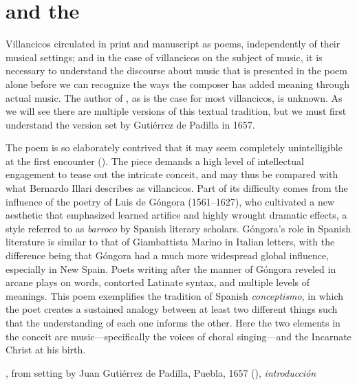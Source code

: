 \section{ and the }

Villancicos circulated in print and manuscript as poems, independently of their
musical settings; and in the case of villancicos on the subject of music, it is
necessary to understand the discourse about music that is presented in the poem
alone before we can recognize the ways the composer has added meaning through
actual music.
The author of , as is the case for most
villancicos, is unknown.
As we will see there are multiple versions of this textual tradition, but we
must first understand the version set by Gutiérrez de Padilla in 1657.

The poem is so elaborately contrived that it may seem completely unintelligible
at the first encounter
().%
    \Autocites
    [37--38, 119--132]{Cashner:WLSCM32}
    [133--203]{Cashner:PhD}
The piece demands a high level of intellectual engagement to tease out the
intricate conceit, and may thus be compared with what Bernardo Illari describes
as  villancicos.%
    \Autocite[vol. 2, 304--308]{Illari:Polychoral}
Part of its difficulty comes from the influence of the poetry of Luis de Góngora
(1561--1627), who cultivated a new aesthetic that emphasized learned artifice
and highly wrought dramatic effects, a style referred to as \emph{barroco} by
Spanish literary scholars.%
    \Autocites
    [222--235]{Gaylord:Poetry}
    [vol. 1, 1014--1061]{Valbuena:Literatura}
Góngora's role in Spanish literature is similar to that of Giambattista Marino
in Italian letters, with the difference being that Góngora had a much more
widespread global influence, especially in New Spain.%
    \Autocite{Tenorio:Gongorismo}
Poets writing after the manner of Góngora reveled in arcane plays on words,
contorted Latinate syntax, and multiple levels of meanings.
This poem exemplifies the tradition of Spanish \emph{conceptismo}, in which the
poet creates a sustained analogy between at least two different things such that
the understanding of each one informs the other.
Here the two elements in the conceit are music---specifically the voices of
choral singing---and the Incarnate Christ at his birth.

{, from setting by Juan Gutiérrez
de Padilla, Puebla, 1657 (), \emph{introducción}}

